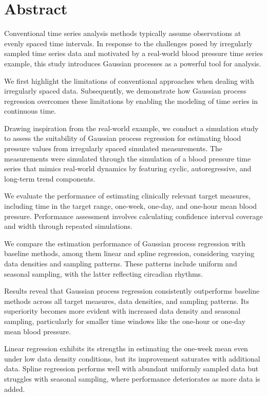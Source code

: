 \chapter*{Abstract}

Conventional time series analysis methods typically assume observations at
evenly spaced time intervals.
In response to the challenges posed by irregularly sampled time series data and
motivated by a real-world blood pressure time series example,
this study introduces Gaussian processes as a powerful tool for analysis.

We first highlight the limitations of conventional approaches when dealing with
irregularly spaced data.
Subsequently, we demonstrate how Gaussian process regression overcomes these
limitations by enabling the modeling of time series in continuous time.

Drawing inspiration from the real-world example, we conduct a simulation study
to assess the suitability of Gaussian process regression for estimating blood
pressure values from irregularly spaced simulated measurements.
The measurements were simulated through the simulation of a blood pressure time
series that mimics real-world dynamics by
featuring cyclic, autoregressive, and long-term trend components.

We evaluate the performance of estimating clinically relevant target measures,
including time in the target range, one-week, one-day, and one-hour mean blood pressure.
Performance assessment involves calculating confidence interval coverage and width
through repeated simulations.

We compare the estimation performance of Gaussian process regression with
baseline methods, among them linear and spline regression,
considering varying data densities and sampling patterns.
These patterns include uniform and seasonal sampling, with the latter reflecting circadian rhythms.

Results reveal that Gaussian process regression consistently outperforms baseline methods
across all target measures, data densities, and sampling patterns.
Its superiority becomes more evident with increased data density and seasonal sampling,
particularly for smaller time windows like the one-hour or one-day mean blood pressure.

Linear regression exhibits its strengths in estimating the one-week mean even
under low data density conditions, but its improvement saturates with additional data.
Spline regression performs well with abundant uniformly sampled data but struggles
with seasonal sampling, where performance deteriorates as more data is added.


